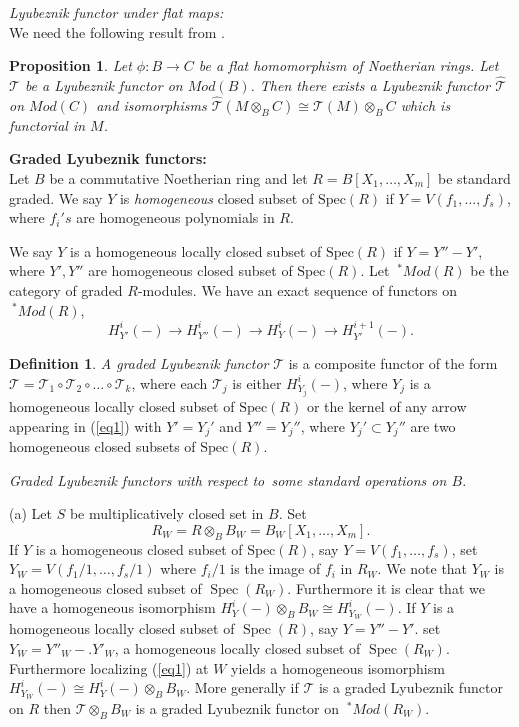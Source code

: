 \documentclass{amsart}
\newcommand{\wrt}{with respect to}
\newcommand{\rt}{\rightarrow}
\newcommand{\FF}{\mathcal{T}}
\newcommand{\Spec}{\operatorname{Spec}}
\theoremstyle{plain}
\newtheorem{proposition}[theorem]{Proposition}
\theoremstyle{definition}
\newtheorem{definition}[theorem]{Definition}
\theoremstyle{remark}
\begin{document}
\s \textit{Lyubeznik functor under flat maps:}\\
We need the following result from \cite[3.1]{Lyu-1}.
\begin{proposition}\label{flat-L}
 Let $\phi \colon B \rt C$ be a flat homomorphism of Noetherian rings. Let $\FF$ be a 
 Lyubeznik functor on $Mod(B)$. Then there exists a Lyubeznik functor $\widehat{\FF}$ on $Mod(C)$ and
 isomorphisms $\widehat{\FF}(M\otimes_B C) \cong \FF(M)\otimes_B C$ which is functorial in $M$.
\end{proposition}
 

\s  \textbf{Graded Lyubeznik functors:} \\
Let $B$ be a commutative Noetherian ring and let $R = B[X_1,\ldots, X_m]$ be standard graded.
We say $Y$ is \textit{homogeneous }closed subset of $\text{Spec}(R)$ if 
$Y= V(f_1, \ldots, f_s)$, where $f_i's$ are homogeneous polynomials in $R$. 


We say $Y$ is a homogeneous locally closed subset of $\text{Spec}(R)$ if $Y=Y''-Y'$, where $Y', Y''$ 
are homogeneous closed subset of $\text{Spec}(R)$.  Let $\ ^*Mod(R)$ be the category of graded $R$-modules. 
We have an exact sequence of  functors on $\ ^*Mod(R)$,
\begin{equation}\label{eq1} H_{Y'}^i(-) \longrightarrow H_{Y''}^i(-) \longrightarrow H_{Y}^i(-) \longrightarrow 
H_{Y'}^{i+1}(-).
\end{equation}

\begin{definition}\label{defn-grade-Lyu-functor}
\textit{A graded Lyubeznik functor} $\mathcal{T}$ is a composite functor of the form 
$\mathcal{T}= \mathcal{T}_1\circ\mathcal{T}_2 \circ \ldots\circ\mathcal{T}_k$, where 
each $\mathcal{T}_j$ is either $H_{Y_j}^i(-)$, where $Y_j$ is a homogeneous locally closed subset of $\text{Spec}(R)$
or the kernel of any arrow appearing in (\ref{eq1}) with $Y'=Y_j'$ and $Y''= Y_j''$, where $Y_j' \subset Y_j''$ are two homogeneous  closed subsets of $\text{Spec}(R)$.
\end{definition}


\s \label{std-op} \textit{Graded Lyubeznik functors \wrt \ some standard operations on $B$.}

(a) Let $S$ be multiplicatively closed set in $B$. Set 
$$R_W = R\otimes_B B_W = B_W[X_1,\ldots, X_m].$$
If $Y$ is a 
homogeneous closed subset of $\text{Spec}(R)$, say
$Y= V(f_1, \ldots, f_s)$, set $Y_W = V(f_1/1, \ldots, f_s/1)$  where $f_i/1$ is the image of $f_i$ in $ R_W$.
We note that
$Y_W$ is a homogeneous closed subset of $\Spec(R_W)$. Furthermore it is clear that we have a homogeneous isomorphism
$H^i_Y(-)\otimes_B B_W \cong H^i_{Y_W}(-)$. If $Y$ is a homogeneous locally closed subset of $\Spec(R)$, say  $Y = Y'' - Y'$. set 
$Y_W = Y''_W - .Y'_W$, a homogeneous locally closed subset of $\Spec(R_W)$. Furthermore localizing (\ref{eq1})
at $W$ yields a
homogeneous isomorphism $H^i_{Y_W}(-) \cong H^i_Y(-)\otimes_B B_W$. More generally if $\FF$ is a graded Lyubeznik functor
on $R$ then $\FF\otimes_B B_W$ is a graded Lyubeznik functor on $ \ ^*Mod(R_W)$.
\end{document}
